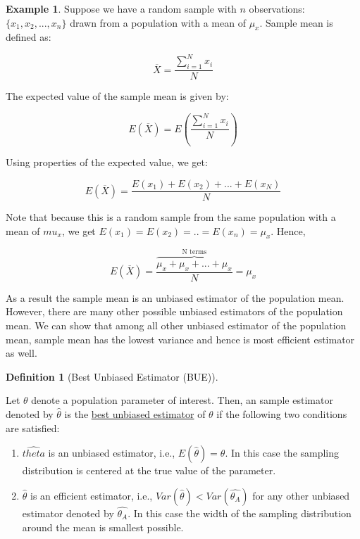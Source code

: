 \documentclass[
]{book}
\theoremstyle{definition}
\newtheorem{definition}{Definition}[chapter]
\theoremstyle{definition}
\newtheorem{example}{Example}[chapter]
\theoremstyle{definition}
\theoremstyle{definition}
\theoremstyle{remark}
\begin{document}
\begin{example}
\protect\hypertarget{exm:unnamed-chunk-91}{}\label{exm:unnamed-chunk-91}Suppose we have a random sample with \(n\) observations: \(\{x_1,x_2,...,x_n\}\) drawn from a population with a mean of \(\mu_x\). Sample mean is defined as:

\[\overline{X}=\frac{\sum_{i=1}^N x_i}{N}\]

The expected value of the sample mean is given by:

\[E(\overline{X})=E\left(\frac{\sum_{i=1}^N x_i}{N}\right)\]

Using properties of the expected value, we get:

\[E(\overline{X})=\frac{E(x_1)+E(x_2)+...+ E(x_N)}{N}\]

Note that because this is a random sample from the same population with a mean of \(mu_x\), we get \(E(x_1)=E(x_2)=..=E(x_n)=\mu_x\). Hence,

\[E(\overline{X})=\frac{\overbrace{\mu_x+\mu_x+...+\mu_x}^{\text{N terms}} }{N}=\mu_x\]

As a result the sample mean is an unbiased estimator of the population mean. However, there are many other possible unbiased estimators of the population mean. We can show that among all other unbiased estimator of the population mean, sample mean has the lowest variance and hence is most efficient estimator as well.
\end{example}

\begin{definition}[Best Unbiased Estimator (BUE)]
\protect\hypertarget{def:unnamed-chunk-92}{}\label{def:unnamed-chunk-92}

Let \(\theta\) denote a population parameter of interest. Then, an sample estimator denoted by \(\hat{\theta}\) is the \underline{best unbiased estimator} of \(\theta\) if the following two conditions are satisfied:

\begin{enumerate}
\def\labelenumi{\arabic{enumi}.}
\item
  \(\hat{theta}\) is an unbiased estimator, i.e., \(E(\hat{\theta})=\theta\). In this case the sampling distribution is centered at the true value of the parameter.
\item
  \(\hat{\theta}\) is an efficient estimator, i.e., \(Var(\hat{\theta})< Var(\hat{\theta_A})\) for any other unbiased estimator denoted by \(\hat{\theta_A}\). In this case the width of the sampling distribution around the mean is smallest possible.
\end{enumerate}

\end{definition}
\end{document}
